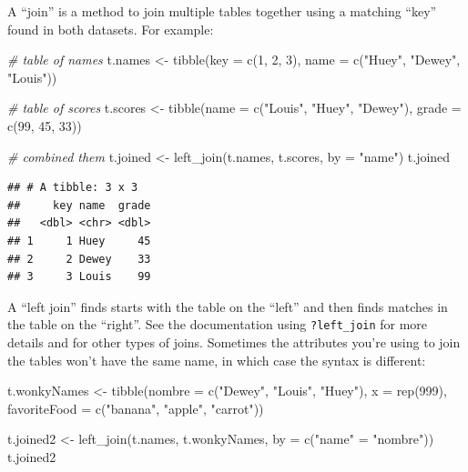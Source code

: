 \documentclass[]{article}
\newenvironment{Shaded}{\begin{snugshade}}{\end{snugshade}}
\newcommand{\AttributeTok}[1]{\textcolor[rgb]{0.77,0.63,0.00}{#1}}
\newcommand{\CommentTok}[1]{\textcolor[rgb]{0.56,0.35,0.01}{\textit{#1}}}
\newcommand{\DecValTok}[1]{\textcolor[rgb]{0.00,0.00,0.81}{#1}}
\newcommand{\FunctionTok}[1]{\textcolor[rgb]{0.00,0.00,0.00}{#1}}
\newcommand{\NormalTok}[1]{#1}
\newcommand{\OtherTok}[1]{\textcolor[rgb]{0.56,0.35,0.01}{#1}}
\newcommand{\StringTok}[1]{\textcolor[rgb]{0.31,0.60,0.02}{#1}}
\begin{document}
A ``join'' is a method to join multiple tables together using a matching
``key'' found in both datasets. For example:

\begin{Shaded}
\begin{Highlighting}[]
\CommentTok{\# table of names}
\NormalTok{t.names }\OtherTok{\textless{}{-}} \FunctionTok{tibble}\NormalTok{(}\AttributeTok{key =} \FunctionTok{c}\NormalTok{(}\DecValTok{1}\NormalTok{, }\DecValTok{2}\NormalTok{, }\DecValTok{3}\NormalTok{), }
             \AttributeTok{name =} \FunctionTok{c}\NormalTok{(}\StringTok{"Huey"}\NormalTok{, }\StringTok{"Dewey"}\NormalTok{, }\StringTok{"Louis"}\NormalTok{))}

\CommentTok{\# table of scores}
\NormalTok{t.scores }\OtherTok{\textless{}{-}} \FunctionTok{tibble}\NormalTok{(}\AttributeTok{name =} \FunctionTok{c}\NormalTok{(}\StringTok{"Louis"}\NormalTok{, }\StringTok{"Huey"}\NormalTok{, }\StringTok{"Dewey"}\NormalTok{),}
                   \AttributeTok{grade =} \FunctionTok{c}\NormalTok{(}\DecValTok{99}\NormalTok{, }\DecValTok{45}\NormalTok{, }\DecValTok{33}\NormalTok{))}

\CommentTok{\# combined them}
\NormalTok{t.joined }\OtherTok{\textless{}{-}} \FunctionTok{left\_join}\NormalTok{(t.names, t.scores, }\AttributeTok{by =} \StringTok{"name"}\NormalTok{)}
\NormalTok{t.joined}
\end{Highlighting}
\end{Shaded}

\begin{verbatim}
## # A tibble: 3 x 3
##     key name  grade
##   <dbl> <chr> <dbl>
## 1     1 Huey     45
## 2     2 Dewey    33
## 3     3 Louis    99
\end{verbatim}

A ``left join'' finds starts with the table on the ``left'' and then
finds matches in the table on the ``right''. See the documentation using
\texttt{?left\_join} for more details and for other types of joins.
Sometimes the attributes you're using to join the tables won't have the
same name, in which case the syntax is different:

\begin{Shaded}
\begin{Highlighting}[]
\NormalTok{t.wonkyNames }\OtherTok{\textless{}{-}} \FunctionTok{tibble}\NormalTok{(}\AttributeTok{nombre =} \FunctionTok{c}\NormalTok{(}\StringTok{"Dewey"}\NormalTok{, }\StringTok{"Louis"}\NormalTok{, }\StringTok{"Huey"}\NormalTok{),}
                       \AttributeTok{x =} \FunctionTok{rep}\NormalTok{(}\DecValTok{999}\NormalTok{),}
                       \AttributeTok{favoriteFood =} \FunctionTok{c}\NormalTok{(}\StringTok{"banana"}\NormalTok{, }\StringTok{"apple"}\NormalTok{, }\StringTok{"carrot"}\NormalTok{))}

\NormalTok{t.joined2 }\OtherTok{\textless{}{-}} \FunctionTok{left\_join}\NormalTok{(t.names, t.wonkyNames, }\AttributeTok{by =} \FunctionTok{c}\NormalTok{(}\StringTok{"name"} \OtherTok{=} \StringTok{"nombre"}\NormalTok{))}
\NormalTok{t.joined2}
\end{Highlighting}
\end{Shaded}
\end{document}
